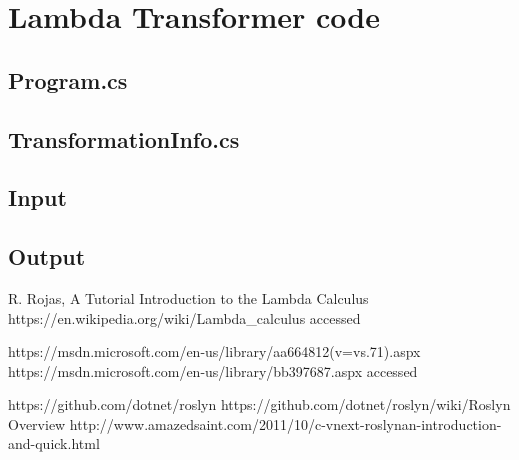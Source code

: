 \documentclass[]{report}
\begin{document}
    \pagebreak

    \section{Lambda Transformer code}

   \subsection{Program.cs}


    
    \pagebreak
    \subsection{TransformationInfo.cs}
    
    \pagebreak
    \subsection{Input}\label{testsInput}
        
            \pagebreak
    \subsection{Output}\label{testsOutput}
          
                  
    
    
\begin{thebibliography}{80}
     R. Rojas, A Tutorial Introduction to the Lambda Calculus
     https://en.wikipedia.org/wiki/Lambda\_calculus accessed \date{01.05.2017}
     https://msdn.microsoft.com/en-us/library/aa664812(v=vs.71).aspx
     https://msdn.microsoft.com/en-us/library/bb397687.aspx
    accessed \date{01.05.2017}
     https://github.com/dotnet/roslyn
     https://github.com/dotnet/roslyn/wiki/Roslyn Overview
     http://www.amazedsaint.com/2011/10/c-vnext-roslynan-introduction-and-quick.html
    

\end{thebibliography}
\end{document}
